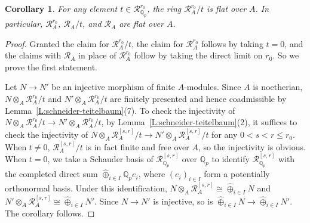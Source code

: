 \documentclass[12pt]{article}
\newtheorem{cor}[theorem]{Corollary}
\theoremstyle{definition}
\numberwithin{equation}{theorem}
\newcommand{\calR}{\mathcal{R}}
\newcommand{\QQ}{\mathbb{Q}}
\def\Qp{\QQ_p}
\begin{document}
\begin{cor}
\label{C:R_A flat over A}
For any element $t \in \calR_{\Qp}^{r_0}$, the ring $\calR_A^{r_0}/t$
is flat over $A$.  In particular, $\calR^{r_0}_A$, $\calR_A/t$, and
$\calR_A$ are flat over $A$.
\end{cor}
\begin{proof}
Granted the claim for $\calR_A^{r_0}/t$, the claim for $\calR_A^{r_0}$
follows by taking $t=0$, and the claims with $\calR_A$ in place of
$\calR_A^{r_0}$ follow by taking the direct limit on $r_0$.  So we
prove the first statement.

Let $N \to N'$ be an injective morphism of finite $A$-modules.  Since $A$ is noetherian, $N \otimes_A \calR_A^{r_0}/t$ and $N'\otimes_A \calR_A^{r_0}/t$ are finitely presented and hence coadmissible by Lemma~\ref{L:schneider-teitelbaum}(7).  To check the injectivity of $N \otimes_A \calR_A^{r_0}/t \to N'\otimes_A \calR_A^{r_0}/t$, by Lemma~\ref{L:schneider-teitelbaum}(2), it suffices to check the injectivity of $N \otimes_A \calR_A^{[s,r]}/t \to N'\otimes_A \calR_A^{[s,r]}/t$ for any $0<s<r\leq r_0$.  When $t \neq 0$, 
$\calR_A^{[s,r]}/t$ is in fact finite and free over $A$, so the injectivity is obvious.  When $t=0$, we take a Schauder basis of $\calR_{\Qp}^{[s,r]}$ over $\Qp$ to identify $\calR_{\Qp}^{[s,r]}$ with the completed direct sum $\widehat \oplus_{i\in I}\Qp e_i$, where $(e_i)_{i \in I}$ form a potentially orthonormal basis.  Under this identification, $N\otimes_A \calR_A^{[s,r]} \cong \widehat \oplus_{i\in I}N$ and $N' \otimes_A \calR_A^{[s,r]} \cong \widehat \oplus_{i\in I}N'$.  Since $N \to N'$ is injective, so is $\widehat \oplus_{i\in I}N \to \widehat \oplus_{i\in I}N'$.  The corollary follows.
\end{proof}
\end{document}
